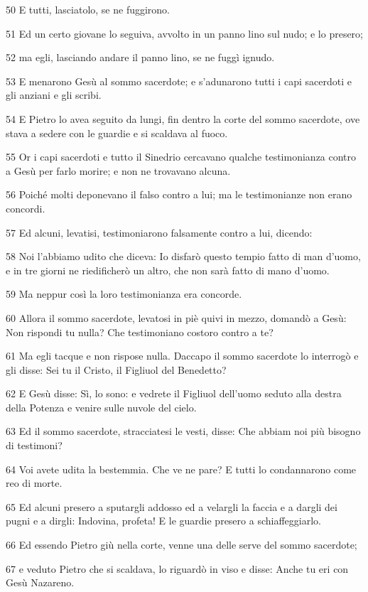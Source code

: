 \par 50 E tutti, lasciatolo, se ne fuggirono.
\par 51 Ed un certo giovane lo seguiva, avvolto in un panno lino sul nudo; e lo presero;
\par 52 ma egli, lasciando andare il panno lino, se ne fuggì ignudo.
\par 53 E menarono Gesù al sommo sacerdote; e s'adunarono tutti i capi sacerdoti e gli anziani e gli scribi.
\par 54 E Pietro lo avea seguito da lungi, fin dentro la corte del sommo sacerdote, ove stava a sedere con le guardie e si scaldava al fuoco.
\par 55 Or i capi sacerdoti e tutto il Sinedrio cercavano qualche testimonianza contro a Gesù per farlo morire; e non ne trovavano alcuna.
\par 56 Poiché molti deponevano il falso contro a lui; ma le testimonianze non erano concordi.
\par 57 Ed alcuni, levatisi, testimoniarono falsamente contro a lui, dicendo:
\par 58 Noi l'abbiamo udito che diceva: Io disfarò questo tempio fatto di man d'uomo, e in tre giorni ne riedificherò un altro, che non sarà fatto di mano d'uomo.
\par 59 Ma neppur così la loro testimonianza era concorde.
\par 60 Allora il sommo sacerdote, levatosi in piè quivi in mezzo, domandò a Gesù: Non rispondi tu nulla? Che testimoniano costoro contro a te?
\par 61 Ma egli tacque e non rispose nulla. Daccapo il sommo sacerdote lo interrogò e gli disse: Sei tu il Cristo, il Figliuol del Benedetto?
\par 62 E Gesù disse: Sì, lo sono: e vedrete il Figliuol dell'uomo seduto alla destra della Potenza e venire sulle nuvole del cielo.
\par 63 Ed il sommo sacerdote, stracciatesi le vesti, disse: Che abbiam noi più bisogno di testimoni?
\par 64 Voi avete udita la bestemmia. Che ve ne pare? E tutti lo condannarono come reo di morte.
\par 65 Ed alcuni presero a sputargli addosso ed a velargli la faccia e a dargli dei pugni e a dirgli: Indovina, profeta! E le guardie presero a schiaffeggiarlo.
\par 66 Ed essendo Pietro giù nella corte, venne una delle serve del sommo sacerdote;
\par 67 e veduto Pietro che si scaldava, lo riguardò in viso e disse: Anche tu eri con Gesù Nazareno.
